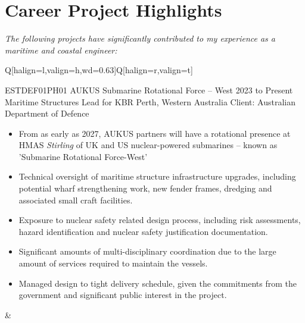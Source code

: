 \section{Career Project Highlights}
\small{\textit{The following projects have significantly contributed to my experience as a maritime and coastal engineer:}}
\renewcommand{\topfraction}{.999}
\renewcommand{\floatpagefraction}{.999}%
\fboxsep=0pt%
\fboxrule=0.5pt%

\FloatBarrier
\begin{table}[h!]
    \begin{tblr}{Q[halign=l,valign=h,wd=0.63\textwidth]Q[halign=r,valign=t]}
    {\entrytableprojecthighlight%
	{ESTDEF01PH01 AUKUS Submarine Rotational Force -- West}
	{2023 to Present}
	{}
	{Maritime Structures Lead for KBR}
	{Perth, Western Australia}
	{Client: Australian Department of Defence}
	{\vspace{1em}\begin{itemize}
		 \item From as early as 2027, AUKUS partners will have a rotational presence at HMAS \textit{Stirling} of UK and US nuclear-powered submarines -- known as 'Submarine Rotational Force-West'
		 \item Technical oversight of maritime structure infrastructure upgrades, including potential wharf strengthening work, new fender frames, dredging and associated small craft facilities. 
		 \item Exposure to nuclear safety related design process, including risk assessments, hazard identification and nuclear safety justification documentation.
		 \item Significant amounts of multi-disciplinary coordination due to the large amount of services required to maintain the vessels.
		 \item Managed design to tight delivery schedule, given the commitments from the government and significant public interest in the project.
	 \end{itemize}}
	} &  \\

\end{tblr}
\end{table}
